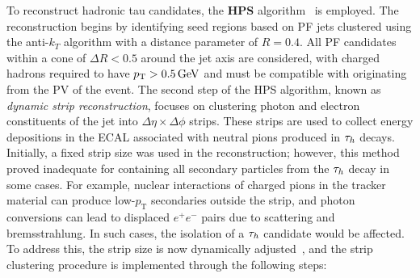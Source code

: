 To reconstruct hadronic tau candidates, the \textbf{\ac{HPS}} algorithm~\cite{Tau_Reco_ID_2015,Tau_Reco_ID_2018} is employed. The reconstruction begins by identifying seed regions based on PF jets clustered using the anti-$k_T$ algorithm with a distance parameter of $R = 0.4$. All PF candidates within a cone of $\Delta R < 0.5$ around the jet axis are considered, with charged hadrons required to have $p_\mathrm{T} > 0.5\,\text{Ge\hspace{-.08em}V}$ and must be compatible with originating from the PV of the event. The second step of the HPS algorithm, known as \textit{dynamic strip reconstruction}, focuses on clustering photon and electron constituents of the jet into $\Delta\eta \times \Delta\phi$ strips. These strips are used to collect energy depositions in the ECAL associated with neutral pions produced in $\tau_h$ decays. Initially, a fixed strip size was used in the reconstruction; however, this method proved inadequate for containing all secondary particles from the $\tau_h$ decay in some cases. For example, nuclear interactions of charged pions in the tracker material can produce low-$p_\mathrm{T}$ secondaries outside the strip, and photon conversions can lead to displaced $e^+e^-$ pairs due to scattering and bremsstrahlung. In such cases, the isolation of a $\tau_h$ candidate would be affected. To address this, the strip size is now dynamically adjusted~\cite{Tau_Reco_ID_2018}, and the strip clustering procedure is implemented through the following steps:

